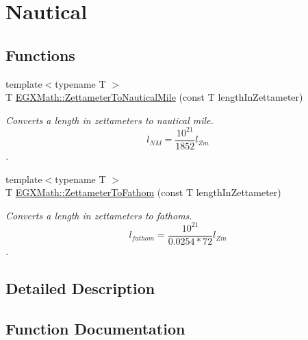 \hypertarget{group___e_g_x_math-_conversions-_length_conversions-_s_i-_zettameter-_nautical}{}\section{Nautical}
\label{group___e_g_x_math-_conversions-_length_conversions-_s_i-_zettameter-_nautical}
\subsection*{Functions}
\begin{DoxyCompactItemize}
\item 
{\footnotesize template$<$typename T $>$ }\\T \mbox{\hyperlink{group___e_g_x_math-_conversions-_length_conversions-_s_i-_zettameter-_nautical_ga474eb2cb88740b3dd9e13fa6e8aa4558}{E\+G\+X\+Math\+::\+Zettameter\+To\+Nautical\+Mile}} (const T length\+In\+Zettameter)
\begin{DoxyCompactList}\small\item\em Converts a length in zettameters to nautical mile. \[ l_{NM}= \frac{10^{21}}{1852} l_{Zm} \]. \end{DoxyCompactList}\item 
{\footnotesize template$<$typename T $>$ }\\T \mbox{\hyperlink{group___e_g_x_math-_conversions-_length_conversions-_s_i-_zettameter-_nautical_ga44aa79d0db3ed37a2e2f4800467008c2}{E\+G\+X\+Math\+::\+Zettameter\+To\+Fathom}} (const T length\+In\+Zettameter)
\begin{DoxyCompactList}\small\item\em Converts a length in zettameters to fathoms. \[ l_{fathom}= \frac{10^{21}}{0.0254 * 72} l_{Zm} \]. \end{DoxyCompactList}\end{DoxyCompactItemize}


\subsection{Detailed Description}


\subsection{Function Documentation}
\mbox{\label{group___e_g_x_math-_conversions-_length_conversions-_s_i-_zettameter-_nautical_ga44aa79d0db3ed37a2e2f4800467008c2}} 
